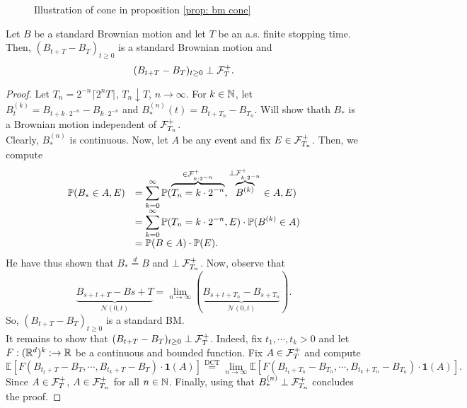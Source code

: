 \documentclass{article}
\begin{document}
\begin{figure}[H]
   \centering
   
   \caption{Illustration of cone in proposition \ref{prop: bm cone}}
\end{figure} 

\newpage
{} 
\begin{theorem}\label{thm: bm strong markov property}
Let $ B$ be a standard Brownian motion and let $ T$ be an a.s. finite stopping time. Then, 
$(B_{t+T}-B_{T})_{t\geq 0}$ is a standard Brownian motion and
\[
	(B_{t+T}-B_{T})_{t\geq 0}\perp \mathcal{F}^{+}_{T}.
\]
\end{theorem}

\begin{proof}
	Let $ T_{n} = 2^{-n}\lceil 2^n T\rceil$, $ T_{n}\downarrow T$, $ n\to \infty$. For $ k\in \mathbb{N}$, let $ B^{(k)}_{t} = B_{t+k\cdot 2^{-n}}-B_{k\cdot 2^{-n}}$ and $ B^{(n)}_{*}(t) = B_{t+T_{n}}-B_{T_{n}}$. Will show thath $ B_{*}$ is a Brownian motion independent of $ \mathcal{F}^{+}_{T_{n}}$.\\ 

	Clearly, $ B^{(n)}_{*}$ is continuous. Now, let $ A$ be any event and fix $ E\in \mathcal{F}^{+}_{T_{n}}$. Then, we compute 
	\[
	\begin{array}{ll}
		\mathbb{P}(B_{*}\in A, E) &=\displaystyle\sum^{\infty}_{k=0}\mathbb{P}(\displaystyle\overbrace{T_{n} = k\cdot 2^{-n}}^{\in \mathcal{F}^{+}_{k\cdot 2^{-n}}} ,\displaystyle\overbrace{B^{(k)}}^{\perp \mathcal{F}^{+}_{k\cdot 2^{-n}}} \in A, E)  \\
	     &= \displaystyle\sum^{\infty}_{k=0}\mathbb{P}(T_{n} = k\cdot 2^{-n} ,E)\cdot \mathbb{P}(B^{(k)}\in A) \\ & = \mathbb{P}(B\in A)\cdot \mathbb{P}(E).
	\end{array}
	\]
	He have thus shown that $ B_{*} \stackrel{d}{=} B$ and $ \perp \mathcal{F}^{+}_{T_{n}}$. Now, observe that 
	\[
\displaystyle\underbrace{B_{s+t+T}-Bs+T}_{ \mathcal{N}(0,t)} = \displaystyle\lim_{n\to \infty}(\displaystyle\underbrace{B_{s+t+T_{n}}-B_{s+T_{n}}}_{ \mathcal{N}(0,t)} ). 
	\]
	So, $ (B_{t+T}-B_{T})_{t\geq 0}$ is a standard BM.\\ 


It remains to show that $ (B_{t+T}-B_{T})_{t\geq 0} \perp \mathcal{F}^{+}_{T}$. Indeed, fix $ t_{1}, \cdots, t_{k}>0$ and let $ F:(\mathbb{R}^{d})^{k}:\to \mathbb{R}$ be a continuous and bounded function. Fix $ A\in\mathcal{F}^{+}_{T}$ and compute 
\[
	\mathbb{E}\left[ F(B_{t_{t}+T}-B_{T}, \cdots, B_{t_{k}+T}-B_{T})\cdot \mathbf{1}(A) \right] \stackrel{\text{DCT}}{=} \displaystyle\lim_{n\to \infty}\mathbb{E}\left[ F(B_{t_{t}+T_{n}}-B_{T_{n}}, \cdots, B_{t_{k}+T_{n}}-B_{T_{n}})\cdot \mathbf{1}(A) \right].
\]
Since $ A\in \mathcal{F}^{+}_{T}$, $ A\in \mathcal{F}^{+}_{T_{n}}$ for all $ n\in \mathbb{N}$. Finally, using that $ B^{(n)}_{*}\perp \mathcal{F}^{+}_{T_{n}}$ concludes the proof.
\end{proof}
\end{document}
